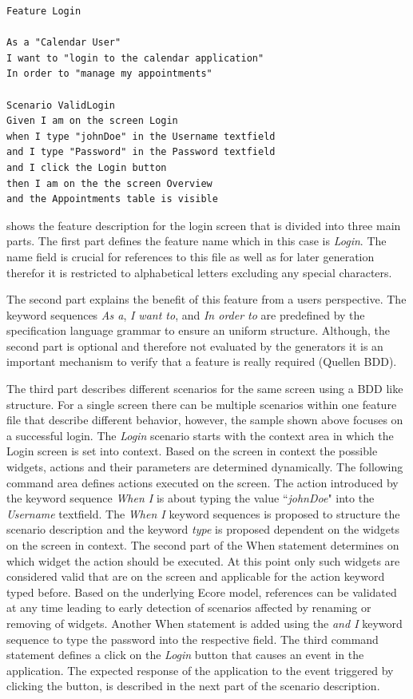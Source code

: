 \documentclass{sig-alternate-05-2015}
\begin{document}
\begin{lstlisting}[captionpos=b, caption=Feature Description: Login Screen., label={lst:featureLogin}, language=dsl]
Feature Login

As a "Calendar User"
I want to "login to the calendar application"
In order to "manage my appointments"

Scenario ValidLogin
Given I am on the screen Login 
when I type "johnDoe" in the Username textfield 
and I type "Password" in the Password textfield 
and I click the Login button
then I am on the the screen Overview 
and the Appointments table is visible
\end{lstlisting}

 shows the feature description for the login screen that is divided into three main parts. 
The first part defines the feature name which in this case is \textit{Login}.
The name field is crucial for references to this file as well as for later generation therefor it is restricted to alphabetical letters excluding any special characters.

The second part explains the benefit of this feature from a users perspective. 
The keyword sequences \textit{As a}, \textit{I want to}, and \textit{In order to} are predefined by the specification language grammar to ensure an uniform structure.
Although, the second part is optional and therefore not evaluated by the generators it is an important mechanism to verify that a feature is really required (Quellen BDD).

The third part describes different scenarios for the same screen using a BDD like structure.
For a single screen there can be multiple scenarios within one feature file that describe different behavior, however, the sample shown above focuses on a successful login.
The \textit{Login} scenario starts with the context area in which the Login screen is set into context. 
Based on the screen in context the possible widgets, actions and their parameters are determined dynamically.
The following command area defines actions executed on the screen.
The action introduced by the keyword sequence \textit{When I} is about typing the value ``\textit{johnDoe}" into the \textit{Username} textfield. 
The \textit{When I} keyword sequences is proposed to structure the scenario description and the keyword \textit{type} is proposed dependent on the widgets on the screen in context.
The second part of the When statement determines on which widget the action should be executed.
At this point only such widgets are considered valid that are on the screen and applicable for the action keyword typed before.
Based on the underlying Ecore model, references can be validated at any time leading to early detection of scenarios affected by renaming or removing of widgets.
Another When statement is added using the \textit{and I} keyword sequence to type the password into the respective field.
The third command statement defines a click on the \textit{Login} button that causes an event in the application.
The expected response of the application to the event triggered by clicking the button, is described in the next part of the scenario description.
\end{document}
